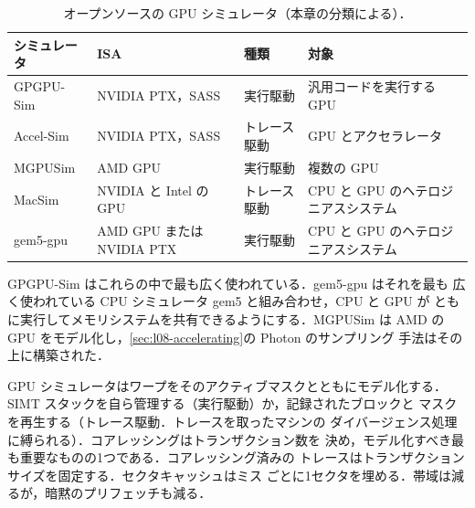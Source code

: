 \documentclass[../main.tex]{subfiles}
\begin{document}
\begin{table}[tb]
  \centering
  \caption{オープンソースの GPU シミュレータ（本章の分類による）．}
  \label{tab:l08-simulators}
  \setlength{\tabcolsep}{4pt}
  \begin{tabular}{@{}>{\raggedright\arraybackslash}p{24mm}
                  >{\raggedright\arraybackslash}p{25mm}
                  >{\raggedright\arraybackslash}p{22mm}%
                  >{\raggedright\arraybackslash}p{37mm}@{}}
    \toprule
    シミュレータ & ISA & 種類 & 対象 \\
    \midrule
    GPGPU-Sim \cite{bakhoda2009gpgpusim} & NVIDIA PTX，SASS
      & 実行駆動 & 汎用コードを実行する GPU \\
    Accel-Sim \cite{khairy2020accelsim} & NVIDIA PTX，SASS
      & トレース駆動 & GPU とアクセラレータ \\
    MGPUSim \cite{sun2019mgpusim} & AMD GPU & 実行駆動
      & 複数の GPU \\
    MacSim \cite{gthparch2026macsim} & NVIDIA と Intel の GPU
      & トレース駆動 & CPU と GPU のヘテロジニアスシステム \\
    gem5-gpu \cite{power2015gem5gpu} & AMD GPU または NVIDIA PTX
      & 実行駆動 & CPU と GPU のヘテロジニアスシステム \\
    \bottomrule
  \end{tabular}
\end{table}

GPGPU-Sim はこれらの中で最も広く使われている．gem5-gpu はそれを最も
広く使われている CPU シミュレータ gem5 と組み合わせ，CPU と GPU が
ともに実行してメモリシステムを共有できるようにする．MGPUSim は AMD の
GPU をモデル化し，\cref{sec:l08-accelerating}の Photon のサンプリング
手法はその上に構築された．

\begin{keypoint}
  GPU シミュレータはワープをそのアクティブマスクとともにモデル化する．
  SIMT スタックを自ら管理する（実行駆動）か，記録されたブロックと
  マスクを再生する（トレース駆動．トレースを取ったマシンの
  ダイバージェンス処理に縛られる）．コアレッシングはトランザクション数を
  決め，モデル化すべき最も重要なものの1つである．コアレッシング済みの
  トレースはトランザクションサイズを固定する．セクタキャッシュはミス
  ごとに1セクタを埋める．帯域は減るが，暗黙のプリフェッチも減る．
\end{keypoint}
\end{document}
